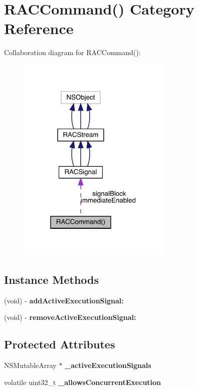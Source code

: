 \hypertarget{category_r_a_c_command_07_08}{}\section{R\+A\+C\+Command() Category Reference}
\label{category_r_a_c_command_07_08}


Collaboration diagram for R\+A\+C\+Command()\+:\nopagebreak
\begin{figure}[H]
\begin{center}
\leavevmode
\includegraphics[width=208pt]{category_r_a_c_command_07_08__coll__graph}
\end{center}
\end{figure}
\subsection*{Instance Methods}
\begin{DoxyCompactItemize}
\item 
\mbox{\label{category_r_a_c_command_07_08_a2f9b09acec459c37f11fb6685a6a2054}} 
(void) -\/ {\bfseries add\+Active\+Execution\+Signal\+:}
\item 
\mbox{\label{category_r_a_c_command_07_08_a557b73da3a0ae52044314deeddb8dc92}} 
(void) -\/ {\bfseries remove\+Active\+Execution\+Signal\+:}
\end{DoxyCompactItemize}
\subsection*{Protected Attributes}
\begin{DoxyCompactItemize}
\item 
\mbox{\label{category_r_a_c_command_07_08_a2a1776855d732174ba3e34515546b680}} 
N\+S\+Mutable\+Array $\ast$ {\bfseries \+\_\+active\+Execution\+Signals}
\item 
\mbox{\label{category_r_a_c_command_07_08_a8ac24ba240fc8b367d436197c5329b13}} 
volatile uint32\+\_\+t {\bfseries \+\_\+allows\+Concurrent\+Execution}
\end{DoxyCompactItemize}

